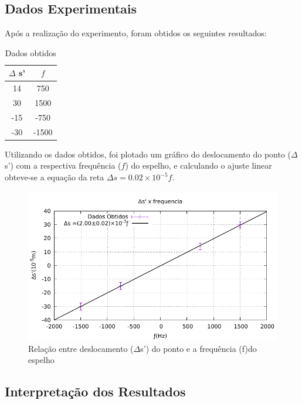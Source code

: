 \subsection{Dados Experimentais}
Após a realização do experimento, foram obtidos os seguintes resultados:
\begin{table}[h!]
\centering

\begin{tabular}{|	c	|	c	|}
\hline
$\Delta$ s' & $f$   \\ \hline
14          & 750   \\ \hline
30          & 1500  \\ \hline
-15         & -750  \\ \hline
-30         & -1500 \\ \hline
\end{tabular}
\caption{Dados obtidos}
\end{table}

Utilizando os dados obtidos, foi plotado um gráfico do deslocamento do ponto ($\Delta$s') com a respectiva frequência ($f$) do espelho, e calculando o
ajuste linear obteve-se a equação da reta $\Delta s
=0.02\times10^{-5}f$.


\begin{figure}[!ht]
	\centering
		\includegraphics[scale= 1.1]{Graficusao/c.pdf}
	\caption{Relação entre deslocamento ($\Delta$s') do ponto e a frequência (f)do espelho }
\end{figure}

\subsection{Interpretação dos Resultados}

